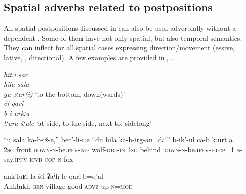 
\subsection{Spatial adverbs related to postpositions}
\label{ssec:SpatialAdverbsDerivedFromPostpositions}

All spatial postpositions discussed in  can also be used adverbially without a dependent  . Some of them have not only spatial, but also temporal semantics. They can inflect for all spatial cases expressing direction\slash movement (essive, lative, , directional). A few examples are provided in , .

\begin{exe}
	\ex	\label{ex:adjectivesWithCHIB}
		\TabPositions{12em}
		\textit{hitːi} 			\tab	\textit{sar}  \\
		\textit{hila }	\tab	\textit{sala}  \\
		\textit{gu} 		\tab	\textit{xːar(i)} `to the bottom, down(wards)'\\
		\textit{či} 		\tab		\textit{qari}  \\
		\textit{b-i} 			\tab		\textit{urkːa}  \\
		\textit{tːura} 		\tab		\textit{šːule} `at side, to the side, next to, sidelong'
\end{exe}

\begin{exe}
	\ex	\label{ex:Now the fox says to the wolf you sit down in front}
	\gll	``u	sala	ka-b-iž-e,''		bec'-li-cːe	``du	hila	ka-b-irg-an=da!''	b-ik'-ul ca-b	kːurtːa  \\ 
		2\textsc{sg}	front	\textsc{down-n}-be.\textsc{pfv}-\textsc{imp}	wolf-\textsc{obl}-\textsc{in} 1\textsc{sg} behind \textsc{down-n}-be.\textsc{ipfv}-\textsc{ptcp}=1	\textsc{n}-say.\textsc{ipfv}-\textsc{icvb} \textsc{cop-n}	fox\\
	\glt	{}

	\ex	\label{ex:The village of Anklukh is pretty high up}
	\gll	ank'luʁi-la	šːi	ʡaˁħ-le	qari-b=q'al\\
		Anklukh-\textsc{gen}	village	good-\textsc{advz}	up-\textsc{n}=\textsc{mod}\\
	\glt	{}
\end{exe}

